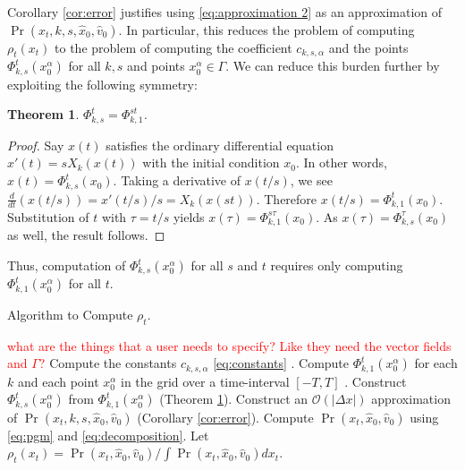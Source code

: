 \documentclass[letterpaper,10pt,conference]{ieeeconf}
\newtheorem{thm}{Theorem}
\newcommand{\Ram}[1]{\textcolor{red}{#1}}
\begin{document}
Corollary \ref{cor:error} justifies using \eqref{eq:approximation 2} as an approximation of $\Pr( x_t, k,s,\hat{x}_0, \hat{v}_0)$.
In particular, this reduces the problem of computing $\rho_t(x_t)$ to the problem of computing the coefficient $c_{k,s,\alpha}$ and the points $\Phi_{k,s}^t(x_0^\alpha)$ for all $k,s$ and points $x_0^{\alpha} \in \Gamma$.
We can reduce this burden further by exploiting the following symmetry:
\begin{thm} \label{thm:symmetry}
	$\Phi_{k,s}^t = \Phi_{k,1}^{st}$.
\end{thm}
\begin{proof}
	Say $x(t)$ satisfies the ordinary differential equation $x'(t) = sX_k(x(t))$ with the initial condition $x_0$.
	In other words, $x(t) = \Phi_{k,s}^{t}(x_0)$.
	Taking a derivative of $x(t/s)$, we see $\frac{d}{dt} (x(t/s)) = x'(t/s) /s = X_k(x(st))$.
	Therefore $x(t/s) = \Phi_{k,1}^{t}( x_0)$.
	Substitution of $t$ with $\tau = t/s$ yields $x(\tau) = \Phi_{k,1}^{s \tau} (x_0)$.
	As $x(\tau) = \Phi_{k,s}^{\tau}(x_0)$ as well, the result follows.
\end{proof}
\noindent Thus, computation of $\Phi_{k,s}^t( x_0^{\alpha})$ for all $s$ and $t$ requires only computing $\Phi_{k,1}^t(x_0^{\alpha})$ for all $t$.


\begin{algorithm}[t]
		  \caption{Algorithm to Compute  $\rho_t$.}
		  \label{alg:1}
		  \begin{algorithmic}[1]
		    \Require \Ram{what are the things that a user needs to specify? Like they need the vector fields and $\Gamma$?}
		    \ForEach {$k \in \mathcal M $  \Ram{having the indexing set over $\alpha$ would be useful here...also how are you discretizing the $s$ space?}}
		    \State Compute the constants $c_{k,s,\alpha}$ \eqref{eq:constants} \label{alg1:step1}. 
		    \State Compute $\Phi_{k,1}^t(x_0^{\alpha})$ for each $k$ and each point $x_0^{\alpha}$ in \hspace*{4.5mm} the grid over a time-interval $[-T,T]$ \label{alg1:step2}.
		    \State Construct $\Phi_{k,s}^t( x_0^\alpha)$ from $\Phi_{k,1}^t(x_0^{\alpha})$ (Theorem \ref{thm:symmetry}).
		    \State Construct an $\mathcal{O}( | \Delta x | )$ approximation of  \hspace*{4.5mm} $\Pr(x_t ,k,s,\hat{x}_0 , \hat{v}_0)$ (Corollary \ref{cor:error}).
		    \EndFor
		    \State Compute $\Pr( x_t, \hat{x}_0, \hat{v}_0)$ using \eqref{eq:pgm} and \eqref{eq:decomposition}.
		    \State Let $\rho_t( x_t) = \Pr(x_t , \hat{x}_0, \hat{v}_0 ) / \int \Pr( x_t, \hat{x}_0, \hat{v}_0) dx_t$.
		  \end{algorithmic}
\end{algorithm}
\end{document}
